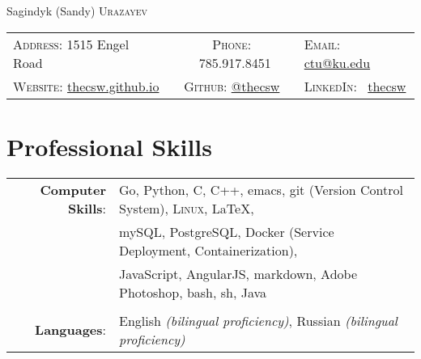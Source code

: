 \documentclass[letterpaper,10pt]{article}
\begin{document}
\pagestyle{empty} %

\enlargethispage{\baselineskip}
\par{\centering
		{\Huge Sagindyk (Sandy) \textsc{Urazayev}
	}\smallskip\par}

      \begin{center}
        \begin{tabular}{lcl}
          \textsc{Address:}   1515 Engel Road &
          \textsc{Phone:} \quad \ 785.917.8451 &
          \textsc{Email:} \quad \href{mailto:ctu@ku.edu}{ctu@ku.edu} \\

          \textsc{Website:} \href{https://thecsw.github.io}{thecsw.github.io}&
          \textsc{Github:} \quad \href{https://github.com/thecsw}{@thecsw}&
          \textsc{LinkedIn:} \ \href{https://linkedin.com/in/thecsw}{thecsw}\\
        \end{tabular}
      \end{center}
      
\section{Professional Skills}
\begin{tabular}{rl}

  \textbf{Computer Skills}:& Go, Python, C, C++, emacs, git (Version Control System), \textsc{Linux}, \LaTeX, \\& mySQL,
  PostgreSQL, Docker (Service Deployment, Containerization),\\&
  JavaScript, AngularJS, markdown, Adobe Photoshop, bash, sh, Java\\\\

  \textbf{Languages}: &English \emph{(bilingual proficiency)}, Russian \emph{(bilingual proficiency)}\\
  
\end{tabular}

\end{document}
